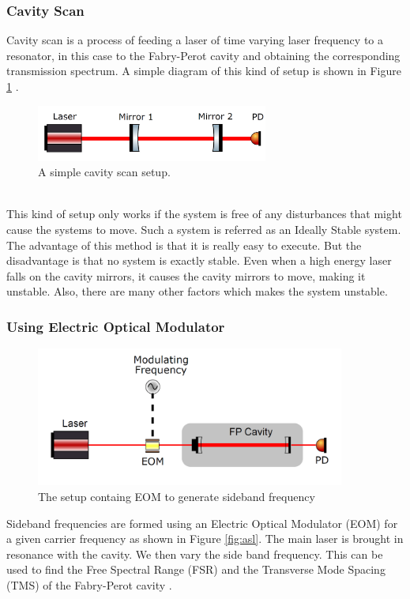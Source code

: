 \documentclass[colorlinks=true,pdfstartview=FitV,linkcolor=blue,
            citecolor=red,urlcolor=magenta]{ligodoc}
\begin{document}
\subsubsection{Cavity Scan}
Cavity scan is a process of feeding a laser of time varying laser frequency to a resonator, in this case to the Fabry-Perot cavity and obtaining the corresponding transmission spectrum. A simple diagram of this kind of setup is shown in Figure \ref{fig:cavityscan} .
\vspace{5mm}
 \begin{figure}[htbp]
\begin{center}
\includegraphics[width=3in]{cavityscan}
\caption{A simple cavity scan setup.}
\label{fig:cavityscan}
\end{center}
\end{figure}
\vspace{5mm}
\\This kind of setup only works if the system is free of any disturbances that might cause the systems to move. Such a system is referred as an Ideally Stable system. The advantage of this method is that it is really easy to execute. But the disadvantage is that no system is exactly stable. Even when a high energy laser falls on the cavity mirrors, it causes the cavity mirrors to move, making it unstable. Also, there are many other factors which makes the system unstable. 
\subsubsection{Using Electric Optical Modulator }
\vspace{5mm}
 \begin{figure}[htbp]
\begin{center}
\includegraphics[width=4in]{eom}
\caption{The setup containg EOM to generate sideband frequency}
\label{fig:eom}
\end{center}
\end{figure}
Sideband frequencies are formed using an Electric Optical Modulator (EOM) for a given carrier frequency as shown in Figure \ref{fig:asl}. The main laser is brought in resonance with the cavity. We then vary the side band frequency. This can be used to find the Free Spectral Range (FSR) and the Transverse Mode Spacing (TMS) of the Fabry-Perot cavity .
\end{document}
